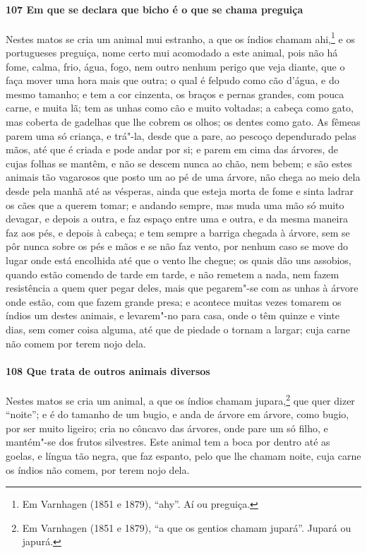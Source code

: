 \begin{linenumbers}
\paragraph{107 Em que se declara que bicho é o que se chama preguiça}\quad
Nestes matos se cria um animal mui estranho, a que os índios chamam ahi,\footnote{ Em
Varnhagen (1851 e 1879), ``ahy''. Aí ou preguiça.} e os portugueses preguiça, nome certo
mui acomodado a este animal, pois não há fome, calma, frio, água, fogo, nem outro nenhum
perigo que veja diante, que o faça mover uma hora mais que outra; o qual é felpudo como
cão d'água, e do mesmo tamanho; e tem a cor cinzenta, os braços e pernas grandes, com
pouca carne, e muita lã; tem as unhas como cão e muito voltadas; a cabeça como gato, mas
coberta de gadelhas que lhe cobrem os olhos; os dentes como gato. As fêmeas parem uma só
criança, e trá"-la, desde que a pare, ao pescoço dependurado pelas mãos, até que é criada e
pode andar por si; e parem em cima das árvores, de cujas folhas se mantêm, e não se descem
nunca ao chão, nem bebem; e são estes animais tão vagarosos que posto um ao pé de uma
árvore, não chega ao meio dela desde pela manhã até as vésperas, ainda que esteja morta de
fome e sinta ladrar os cães que a querem tomar; e andando sempre, mas muda uma mão só
muito devagar, e depois a outra, e faz espaço entre uma e outra, e da mesma maneira faz
aos pés, e depois à cabeça; e tem sempre a barriga chegada à árvore, sem se pôr nunca
sobre os pés e mãos e se não faz vento, por nenhum caso se move do lugar onde está
encolhida até que o vento lhe chegue; os quais dão uns assobios, quando estão comendo de
tarde em tarde, e não remetem a nada, nem fazem resistência a quem quer pegar deles, mais
que pegarem"-se com as unhas à árvore onde estão, com que fazem grande presa; e acontece
muitas vezes tomarem os índios um destes animais, e levarem"-no para casa, onde o têm
quinze e vinte dias, sem comer coisa alguma, até que de piedade o tornam a largar; cuja
carne não comem por terem nojo dela.

\paragraph{108 Que trata de outros animais diversos}\quad
Nestes matos se cria um animal, a que os índios chamam jupara,\footnote{ Em Varnhagen
(1851 e 1879), ``a que os gentios chamam jupará''. Jupará ou japurá.} que quer dizer
``noite''; e é do tamanho de um bugio, e anda de árvore em árvore, como bugio, por ser
muito ligeiro; cria no côncavo das árvores, onde pare um só filho, e mantém"-se dos frutos
silvestres. Este animal tem a boca por dentro até as goelas, e língua tão negra, que faz
espanto, pelo que lhe chamam noite, cuja carne os índios não comem, por terem nojo dela.


\end{linenumbers}
